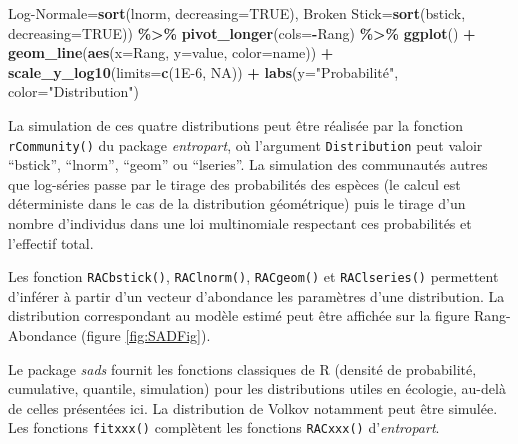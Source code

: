 \documentclass[
  11pt,
  french,
  a4paper,
  extrafontsizes,onecolumn,openright
  ]{memoir}
\newenvironment{Shaded}{\begin{snugshade}}{\end{snugshade}}
\newcommand{\AttributeTok}[1]{\textcolor[rgb]{0.13,0.29,0.53}{#1}}
\newcommand{\ConstantTok}[1]{\textcolor[rgb]{0.56,0.35,0.01}{#1}}
\newcommand{\FloatTok}[1]{\textcolor[rgb]{0.00,0.00,0.81}{#1}}
\newcommand{\FunctionTok}[1]{\textcolor[rgb]{0.13,0.29,0.53}{\textbf{#1}}}
\newcommand{\NormalTok}[1]{#1}
\newcommand{\OtherTok}[1]{\textcolor[rgb]{0.56,0.35,0.01}{#1}}
\newcommand{\SpecialCharTok}[1]{\textcolor[rgb]{0.81,0.36,0.00}{\textbf{#1}}}
\newcommand{\StringTok}[1]{\textcolor[rgb]{0.31,0.60,0.02}{#1}}
\begin{document}
\begin{Shaded}
\begin{Highlighting}[]
      \StringTok{\textasciigrave{}}\AttributeTok{Log{-}Normale}\StringTok{\textasciigrave{}}\OtherTok{=}\FunctionTok{sort}\NormalTok{(lnorm, }\AttributeTok{decreasing=}\ConstantTok{TRUE}\NormalTok{),}
      \StringTok{\textasciigrave{}}\AttributeTok{Broken Stick}\StringTok{\textasciigrave{}}\OtherTok{=}\FunctionTok{sort}\NormalTok{(bstick, }\AttributeTok{decreasing=}\ConstantTok{TRUE}\NormalTok{)) }\SpecialCharTok{\%\textgreater{}\%} 
  \FunctionTok{pivot\_longer}\NormalTok{(}\AttributeTok{cols=}\SpecialCharTok{{-}}\NormalTok{Rang) }\SpecialCharTok{\%\textgreater{}\%} 
  \FunctionTok{ggplot}\NormalTok{() }\SpecialCharTok{+}
  \FunctionTok{geom\_line}\NormalTok{(}\FunctionTok{aes}\NormalTok{(}\AttributeTok{x=}\NormalTok{Rang, }\AttributeTok{y=}\NormalTok{value, }\AttributeTok{color=}\NormalTok{name)) }\SpecialCharTok{+}
  \FunctionTok{scale\_y\_log10}\NormalTok{(}\AttributeTok{limits=}\FunctionTok{c}\NormalTok{(}\FloatTok{1E{-}6}\NormalTok{, }\ConstantTok{NA}\NormalTok{)) }\SpecialCharTok{+}
  \FunctionTok{labs}\NormalTok{(}\AttributeTok{y=}\StringTok{"Probabilité"}\NormalTok{, }\AttributeTok{color=}\StringTok{"Distribution"}\NormalTok{)}
\end{Highlighting}
\end{Shaded}

\normalsize

La simulation de ces quatre distributions peut être réalisée par la fonction \texttt{rCommunity()} du package \emph{entropart}, où l'argument \texttt{Distribution} peut valoir ``bstick'', ``lnorm'', ``geom'' ou ``lseries''.
La simulation des communautés autres que log-séries passe par le tirage des probabilités des espèces (le calcul est déterministe dans le cas de la distribution géométrique) puis le tirage d'un nombre d'individus dans une loi multinomiale respectant ces probabilités et l'effectif total.

Les fonction \texttt{RACbstick()}, \texttt{RAClnorm()}, \texttt{RACgeom()} et \texttt{RAClseries()} permettent d'inférer à partir d'un vecteur d'abondance les paramètres d'une distribution.
La distribution correspondant au modèle estimé peut être affichée sur la figure Rang-Abondance (figure \ref{fig:SADFig}).

Le package \emph{sads} fournit les fonctions classiques de R (densité de probabilité, cumulative, quantile, simulation) pour les distributions utiles en écologie, au-delà de celles présentées ici.
La distribution de Volkov notamment peut être simulée.
Les fonctions \texttt{fitxxx()} complètent les fonctions \texttt{RACxxx()} d'\emph{entropart}.
\end{document}
